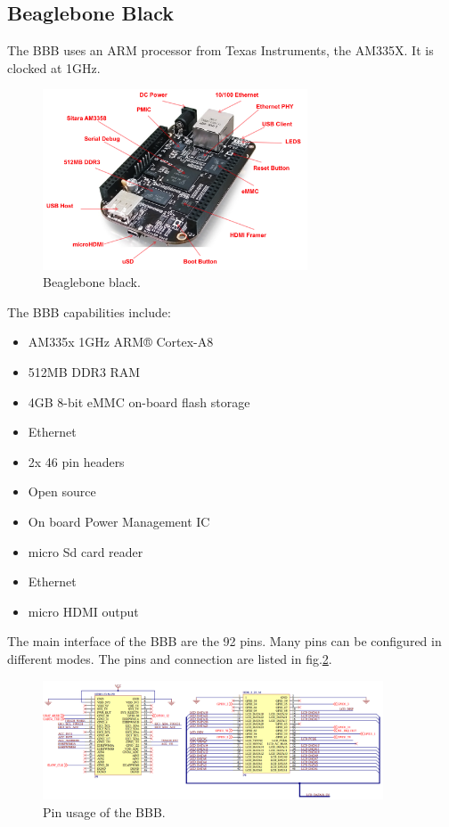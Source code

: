 
\clearpage

\subsection{Beaglebone Black}
The BBB uses an ARM processor from Texas Instruments, the AM335X. It is clocked at 1GHz.

\begin{figure}[!htb]
    \centering
    \includegraphics[width=0.7\textwidth,keepaspectratio]{chap/hardFig/bbb.png}
    \caption{Beaglebone black.}
    \label{fig:bbb}
\end{figure}
The BBB capabilities include:
\begin{itemize}
  \item{ AM335x 1GHz ARM® Cortex-A8 }
  \item{512MB DDR3 RAM}
  \item{4GB 8-bit eMMC on-board flash storage}
  \item{Ethernet}
  \item{2x 46 pin headers}
  \item{Open source}
  \item{On board Power Management IC}
  \item{micro Sd card reader}
  \item{Ethernet}
  \item{micro HDMI output}
\end{itemize}
The main interface of the BBB are the 92 pins. Many pins can be configured in different modes. The pins and connection are listed in fig.\ref{fig:pin modes}.
\clearpage


\begin{figure}
    \centering
    \includegraphics[width=0.9\textwidth,keepaspectratio]{chap/hardFig/BBB_pins_sch}
    \caption{Pin usage of the BBB.}
    \label{fig:pin modes}
\end{figure}

